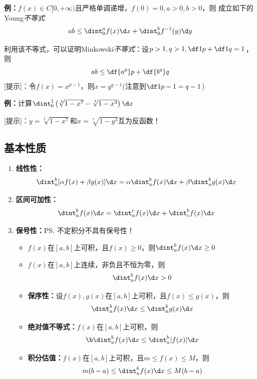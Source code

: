 \begin{shaded}
{\bf 例：}$f(x)\in C[0,+\infty)$且严格单调递增，$f(0)=0,a>0,b>0$，则
成立如下的Young{\it 不等式}
$$ab\leq\dint_0^af(x)\d x+\dint_0^bf^{-1}(y)\d y$$
\begin{center}
\end{center}
利用该不等式，可以证明Minkowski{\it 不等式}：设$p>1,q>1,\df1p+\df1q=1$，则
$$ab\leq\df{a^p}p+\df{b^q}q$$
[提示]：令$f(x)=x^{p-1}$，则$x=y^{q-1}$(注意到$\df1{p-1}=q-1$)

{\bf 例：}计算$\dint_0^1\left(\sqrt[3]{1-x^7}-\sqrt[7]{1-x^3}\right)\d x$

[提示]：$y=\sqrt[3]{1-x^7}$和$x=\sqrt[7]{1-y^3}$互为反函数！

\end{shaded}

\subsection{基本性质}

\begin{enumerate}[(1)]
  \setlength{\itemindent}{1cm}
  \item {\bf 线性性：}
  $$\dint_a^b[\alpha
  f(x)+\beta g(x)]\d x=\alpha\dint_a^bf(x)\d x+\beta\dint_a^bg(x)\d x$$
  \item {\bf 区间可加性：}
  $$\dint_a^bf(x)\d x=\dint_a^cf(x)\d x+\dint_c^bf(x)\d x$$
  \item {\bf 保号性：}\ps{不定积分不具有保号性！}
  \begin{itemize}
    \item $f(x)$在$[a,b]$上可积，且$f(x)\geq 0$，则$\dint_a^bf(x)\d x\geq 0$ 
    \item $f(x)$在$[a,b]$上连续，非负且不恒为零，则$$\dint_a^bf(x)\d x> 0$$ 
    \item {\bf 保序性：}设$f(x),g(x)$在$[a,b]$上可积，且$f(x)\leq g(x)$，则
    $$\dint_a^bf(x)\d x\leq \dint_a^bg(x)\d x$$
    \item {\bf 绝对值不等式：}$f(x)$在$[a,b]$上可积，则
    $${\b \dint_a^bf(x)\d x\leq\dint_a^b|f(x)|\d x}$$ 
    \item {\bf 积分估值：}$f(x)$在$[a,b]$上可积，且$m\leq f(x)\leq M$，则
    $$m(b-a)\leq\dint_a^bf(x)\d x\leq M(b-a)$$
  \end{itemize}
\end{enumerate}

